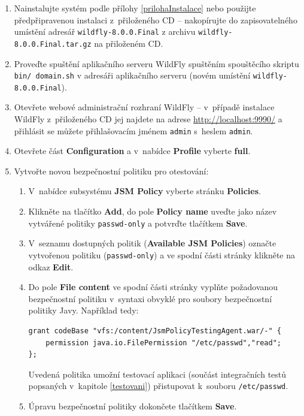 \begin{enumerate}
  
  \item Nainstalujte systém podle přílohy \ref{prilohaInstalace} nebo použijte předpřipravenou instalaci z~přiloženého CD -- nakopírujte do zapisovatelného umístění adresář {\tt wildfly-8.0.0.Final} z archivu {\tt wildfly-8.0.0.Final.tar.gz} na přiloženém CD.
  \item Proveďte spuštění aplikačního serveru WildFly spuštěním spouštěcího skriptu {\tt bin/ domain.sh} v adresáři aplikačního serveru (novém umístění {\tt wildfly-8.0.0.Final}).
  \item Otevřete webové administrační rozhraní WildFly -- v~případě instalace WildFly z~přiloženého CD jej najdete na adrese \url{http://localhost:9990/} a přihlásit se můžete přihlašovacím jménem {\tt admin} s~heslem {\tt admin}.
  \item Otevřete část {\bf Configuration} a v~nabídce {\bf Profile} vyberte {\bf full}.
  
  \item Vytvořte novou bezpečnostní politiku pro otestování:
  \begin{enumerate}
    \item V~nabídce subsystému {\bf JSM Policy} vyberte stránku {\bf Policies}.
    \item Klikněte na tlačítko {\bf Add}, do pole {\bf Policy name} uveďte jako název vytvářené politiky {\tt passwd-only} a potvrďte tlačítkem {\bf Save}.
    \item V~seznamu dostupných politik ({\bf Available JSM Policies}) označte vytvořenou politiku ({\tt passwd-only}) a ve spodní části stránky klikněte na odkaz {\bf Edit}.
    \item Do pole {\bf File content} ve spodní části stránky vyplňte požadovanou bezpečnostní politiku v~syntaxi obvyklé pro soubory bezpečnostní politiky Javy. Například tedy:
    \begin{lstlisting}
grant codeBase "vfs:/content/JsmPolicyTestingAgent.war/-" {
    permission java.io.FilePermission "/etc/passwd","read";
};
    \end{lstlisting}
    Uvedená politika umožní testovací aplikaci (součást integračních testů popsaných v~kapitole \ref{testovani}) přistupovat k~souboru {\tt /etc/passwd}.
    \item Úpravu bezpečnostní politiky dokončete tlačítkem {\bf Save}.
  \end{enumerate}
  

\end{enumerate}
